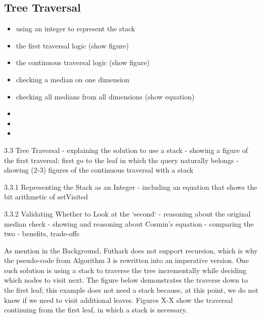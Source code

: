 \subsection{Tree Traversal}
\label{sec:traversal}


\begin{itemize}
	\item using an integer to represent the stack
	\item the first traversal logic (show figure)
	\item the continuous traversal logic (show figure)
	\item checking a median on one dimension
	\item checking all medians from all dimensions (show equation)
	\item 
	\item 
	\item 
\end{itemize}	

  3.3 Tree Traversal
    - explaining the solution to use a stack 
    - showing a figure of the first traversal: first go to the leaf in which the query naturally belongs 
    - showing (2-3) figures of the continuous traversal with a stack

    3.3.1 Representing the Stack as an Integer
      - including an equation that shows the bit arithmetic of setVisited

    3.3.2 Validating Whether to Look at the `second`
      - reasoning about the original median check
      - showing and reasoning about Cosmin's equation
      - comparing the two
        - benefits, trade-offs



As mention in the Background, Futhark does not support recursion, which is why the pseudo-code from Algorithm 3 is rewritten into an imperative version. One such solution is using a stack to traverse the tree incrementally while deciding which nodes to visit next. The figure below demonstrates the traverse down to the first leaf; this example does not need a stack because, at this point, we do not know if we need to visit additional leaves. Figures X-X show the traversal continuing from the first leaf, in which a stack is necessary. 

